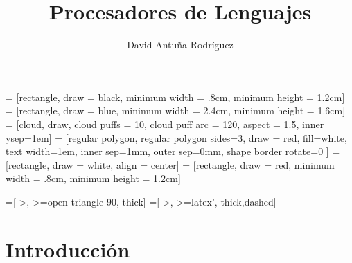 \documentclass[11pt]{article}
\title{Procesadores de Lenguajes}
\author{David Antuña Rodríguez}
\date{}
\newcounter{subsubsubsection}[subsubsection]
\begin{document}
= [rectangle, draw = black, minimum width = .8cm, minimum height = 1.2cm]
= [rectangle, draw = blue, minimum width = 2.4cm, minimum height = 1.6cm]
 = [cloud, draw, cloud puffs = 10, cloud puff arc = 120, aspect = 1.5, inner ysep=1em]
 = [regular polygon, regular polygon sides=3, draw = red, fill=white, text width=1em, inner sep=1mm, outer sep=0mm, shape border rotate=0 ]
= [rectangle, draw = white, align = center]
= [rectangle, draw = red, minimum width = .8cm, minimum height = 1.2cm]

=[->, >=open triangle 90, thick]
=[->, >=latex', thick,dashed]


\raggedright
\maketitle
\newpage
\tableofcontents
\newpage
{}

\section{Introducción}
 {
  \let\section\subsection
  \let\subsection\subsubsection
  \let\subsubsection\subsubsubsection
  
 }
\end{document}
